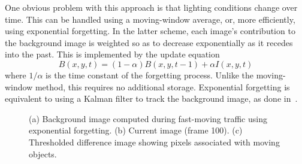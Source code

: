 One obvious problem with this approach is that lighting conditions
change over time. This can be handled using a moving-window average,
or, more efficiently, using exponential forgetting. In the latter
scheme, each image's contribution to the background image is weighted
so as to decrease exponentially as it recedes into the past. This is
implemented by the update equation
\begin{equation}
B(x,y,t) = (1-\alpha)B(x,y,t-1) + \alpha I(x,y,t)
\label{forgetting-equation}
\end{equation}
where $1/\alpha$ is the time constant of the forgetting process.
Unlike the moving-window method, this requires no additional storage.
Exponential forgetting is equivalent to using a Kalman filter to track
the background image, as done in~\cite{Koller+al:1994}.




\begin{figure}[t]
\centering
{}
\caption{(a) Background image computed during fast-moving traffic
using exponential forgetting. (b) Current image (frame 100). (c) Thresholded
difference image showing pixels associated with moving objects.}
\label{fast-traffic-figure}
\end{figure}

